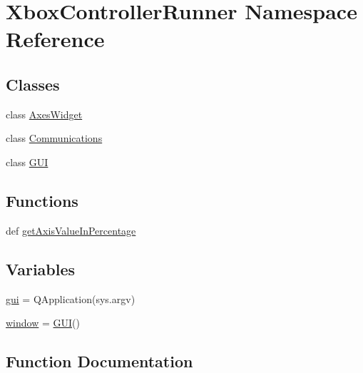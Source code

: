 \hypertarget{namespace_xbox_controller_runner}{}\section{Xbox\+Controller\+Runner Namespace Reference}
\label{namespace_xbox_controller_runner}
\subsection*{Classes}
\begin{DoxyCompactItemize}
\item 
class \mbox{\hyperlink{class_xbox_controller_runner_1_1_axes_widget}{Axes\+Widget}}
\item 
class \mbox{\hyperlink{class_xbox_controller_runner_1_1_communications}{Communications}}
\item 
class \mbox{\hyperlink{class_xbox_controller_runner_1_1_g_u_i}{G\+UI}}
\end{DoxyCompactItemize}
\subsection*{Functions}
\begin{DoxyCompactItemize}
\item 
def \mbox{\hyperlink{namespace_xbox_controller_runner_a9985152435d9138381196655b65e6ecc}{get\+Axis\+Value\+In\+Percentage}}
\end{DoxyCompactItemize}
\subsection*{Variables}
\begin{DoxyCompactItemize}
\item 
\mbox{\hyperlink{namespace_xbox_controller_runner_a1dfe9a9a9542fbbf1f5030bb2a642a8a}{gui}} = Q\+Application(sys.\+argv)
\item 
\mbox{\hyperlink{namespace_xbox_controller_runner_a4e420c15851287008c4dabe0a9621894}{window}} = \mbox{\hyperlink{class_xbox_controller_runner_1_1_g_u_i}{G\+UI}}()
\end{DoxyCompactItemize}


\subsection{Function Documentation}
\mbox{\label{namespace_xbox_controller_runner_a9985152435d9138381196655b65e6ecc}} 
